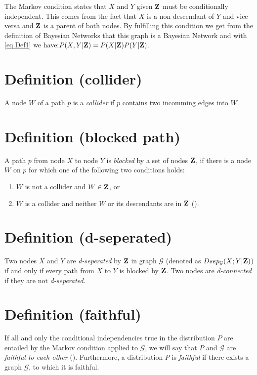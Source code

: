 		The Markov condition states that $X$ and $Y$ given ${\textbf{Z}}$ must be conditionally independent. This comes from the fact that $X$ is a non-descendant of $Y$ and vice versa and ${\textbf{Z}}$ is a parent of both nodes. By fulfilling this condition we get from the definition of Bayesian Networks that this graph is a Bayesian Network and with \autoref{eq.Def1} we have:$P(X , Y|{\textbf{Z}}) = P(X|{\textbf{Z}})P(Y|{\textbf{Z}})$.

	\section*{Definition (collider)} \label{s.Def4}

		A node $W$ of a path $p$ is a \textit{collider} if $p$ contains two incomming edges into $W$.

	\section*{Definition (blocked path)} \label{s.Def5}

		A path $p$ from node $X$ to node $Y$ is \textit{blocked} by a set of nodes ${\textbf{Z}}$, if there is a node $W$ on $p$ for which one of the following two conditions holds:

		\begin{enumerate}
			\item $W$ is not a collider and $W \in {\textbf{Z}}$, or
			\item $W$ is a collider and neither $W$ or its descendants are in ${\textbf{Z}}$ (\cite{P88}).
		\end{enumerate}

	\section*{Definition (d-seperated)} \label{s.Def6}

		Two nodes $X$ and $Y$ are \textit{d-seperated} by ${\textbf{Z}}$ in graph $\mathcal{G}$ (denoted as $Dsep_{\mathcal{G}}(X;Y|{\textbf{Z}})$) if and only if every path from $X$ to $Y$ is blocked by ${\textbf{Z}}$. Two nodes are \textit{d-connected} if they are not \textit{d-seperated}.

	\section*{Definition (faithful)} \label{s.Def7}

		If all and only the conditional independencies true in the distribution $P$ are entailed by the Markov condition applied to $\mathcal{G}$, we will say that $P$ and $\mathcal{G}$ are \textit{faithful to each other} (\cite{SGSN}). Furthermore, a distribution $P$ is \textit{faithful} if there exists a graph $\mathcal{G}$, to which it is faithful.

